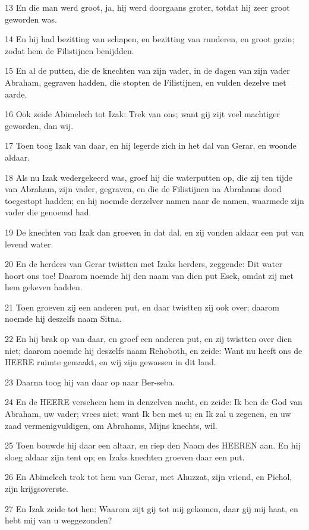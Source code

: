 \par 13 En die man werd groot, ja, hij werd doorgaans groter, totdat hij zeer groot geworden was.
\par 14 En hij had bezitting van schapen, en bezitting van runderen, en groot gezin; zodat hem de Filistijnen benijdden.
\par 15 En al de putten, die de knechten van zijn vader, in de dagen van zijn vader Abraham, gegraven hadden, die stopten de Filistijnen, en vulden dezelve met aarde.
\par 16 Ook zeide Abimelech tot Izak: Trek van ons; want gij zijt veel machtiger geworden, dan wij.
\par 17 Toen toog Izak van daar, en hij legerde zich in het dal van Gerar, en woonde aldaar.
\par 18 Als nu Izak wedergekeerd was, groef hij die waterputten op, die zij ten tijde van Abraham, zijn vader, gegraven, en die de Filistijnen na Abrahams dood toegestopt hadden; en hij noemde derzelver namen naar de namen, waarmede zijn vader die genoemd had.
\par 19 De knechten van Izak dan groeven in dat dal, en zij vonden aldaar een put van levend water.
\par 20 En de herders van Gerar twistten met Izaks herders, zeggende: Dit water hoort ons toe! Daarom noemde hij den naam van dien put Esek, omdat zij met hem gekeven hadden.
\par 21 Toen groeven zij een anderen put, en daar twistten zij ook over; daarom noemde hij deszelfs naam Sitna.
\par 22 En hij brak op van daar, en groef een anderen put, en zij twistten over dien niet; daarom noemde hij deszelfs naam Rehoboth, en zeide: Want nu heeft ons de HEERE ruimte gemaakt, en wij zijn gewassen in dit land.
\par 23 Daarna toog hij van daar op naar Ber-seba.
\par 24 En de HEERE verscheen hem in denzelven nacht, en zeide: Ik ben de God van Abraham, uw vader; vrees niet; want Ik ben met u; en Ik zal u zegenen, en uw zaad vermenigvuldigen, om Abrahams, Mijns knechts, wil.
\par 25 Toen bouwde hij daar een altaar, en riep den Naam des HEEREN aan. En hij sloeg aldaar zijn tent op; en Izaks knechten groeven daar een put.
\par 26 En Abimelech trok tot hem van Gerar, met Ahuzzat, zijn vriend, en Pichol, zijn krijgsoverste.
\par 27 En Izak zeide tot hen: Waarom zijt gij tot mij gekomen, daar gij mij haat, en hebt mij van u weggezonden?
